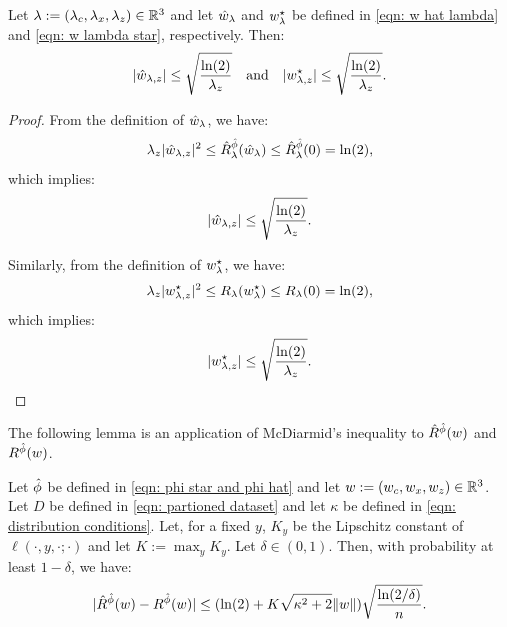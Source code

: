 \begin{lem}\label{lem: bound weights in terms of lambda}
    Let $\lambda := (\lambda_c,\lambda_x,\lambda_z) \in \mathbb{R}^3$ and let $\hat{w}_\lambda$ and $w^\star_{\lambda}$ be defined in  \eqref{eqn: w hat lambda} and  \eqref{eqn: w lambda star}, respectively. Then:
    \begin{equation*}
        |\hat{w}_{\lambda,z}| \leq \sqrt{\frac{\ln(2)}{\lambda_z}} \quad \text{and} \quad |w^\star_{{\lambda,z}}| \leq \sqrt{\frac{\ln(2)}{\lambda_z}}.
    \end{equation*}
\end{lem}

\begin{proof}
    From the definition of $\hat{w}_\lambda$, we have:
    \begin{equation*}
        \lambda_z|\hat{w}_{\lambda,z}|^2 \leq \hat{R}^{\hat{\phi}}_\lambda(\hat{w}_\lambda) \leq \hat{R}^{\hat{\phi}}_\lambda(0) = \ln(2),
    \end{equation*}
    which implies:
    \begin{equation*}
        |\hat{w}_{\lambda,z}| \leq \sqrt{\frac{\ln(2)}{\lambda_z}}.
    \end{equation*}

    \noindent Similarly, from the definition of $w^\star_{\lambda}$, we have:
    \begin{equation*}
        \lambda_z|w^\star_{{\lambda,z}}|^2 \leq R_\lambda(w^\star_{\lambda}) \leq R_\lambda(0) = \ln(2),
    \end{equation*}
    which implies:
    \begin{equation*}
        |w^\star_{{\lambda,z}}| \leq \sqrt{\frac{\ln(2)}{\lambda_z}}.
    \end{equation*}
\end{proof}

The following lemma is an application of McDiarmid's inequality to $\hat{R}^{\hat{\phi}}(w)$ and $R^{\hat{\phi}}(w)$.

\begin{lem}\label{lem: McDiamird's inequality}
    Let $\hat{\phi}$ be defined in  \eqref{eqn: phi star and phi hat} and let $w := (w_c,w_x,w_z) \in \mathbb{R}^3$. Let $D$ be defined in \eqref{eqn: partioned dataset} and let $\kappa$ be defined in \eqref{eqn: distribution conditions}. Let, for a fixed $y$, $K_y$ be the Lipschitz constant of $\ell(\cdot,y,\cdot;\cdot)$ and let $K := \max_y K_y$. Let $\delta \in (0,1)$. Then, with probability at least $1-\delta$, we have:
    \begin{equation}
        |\hat{R}^{\hat{\phi}}(w) - R^{\hat{\phi}}(w)|
        \leq (\ln(2) + K\sqrt{\kappa^2 + 2}\|w\|)\sqrt{\frac{\ln(2/\delta)}{n}}.
    \end{equation}
\end{lem}

